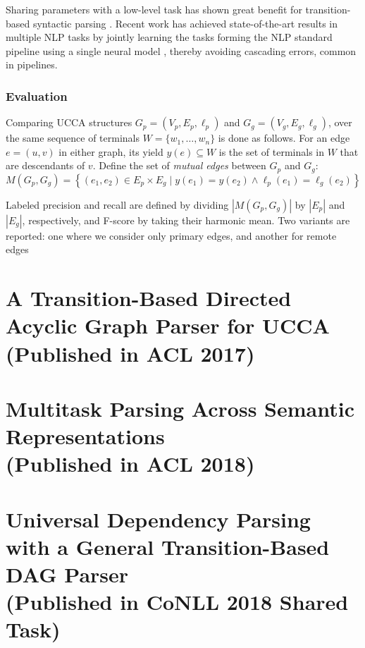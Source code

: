 \documentclass[12pt,a4paper]{report}
\begin{document}
Sharing parameters with a low-level task
has shown great benefit for transition-based syntactic parsing
\citep{bohnet2012transition,Zhang2016StackpropagationIR,constant-nivre:2016:P16-1,more2016joint}.
Recent work has achieved state-of-the-art results in multiple NLP tasks
by jointly learning the tasks forming the NLP standard pipeline using 
a single neural model \citep{collobert2011natural,D17-1206},
thereby avoiding cascading errors, common in pipelines.


\subsection*{Evaluation}
Comparing UCCA structures
$G_p=(V_p,E_p,\ell_p)$ and $G_g=(V_g,E_g,\ell_g)$,
over the same sequence of terminals $W = \{w_1,\ldots,w_n\}$
is done as follows.
For an edge $e=(u,v)$ in either graph, its yield $y(e) \subseteq W$ is the
set of terminals in $W$ that are descendants of $v$.
Define the set of \textit{mutual edges} between $G_p$ and $G_g$:
\[
    M(G_p,G_g) =
    \left\{(e_1,e_2) \in E_p \times E_g \;|\;
    y(e_1) = y(e_2) \wedge \ell_p(e_1)=\ell_g(e_2)\right\}
\]

Labeled precision and recall are defined by dividing $|M(G_p,G_g)|$ by $|E_p|$ and $|E_g|$, respectively,
and F-score by taking their harmonic mean.
Two variants are reported: one where we consider only primary edges,
and another for remote edges



\chapter{A Transition-Based Directed Acyclic Graph Parser for UCCA \\ (Published in ACL 2017)}



\chapter{Multitask Parsing Across Semantic Representations \\ (Published in ACL 2018)}



\chapter{Universal Dependency Parsing with a General Transition-Based DAG Parser \\ (Published in CoNLL 2018 Shared Task)}
\end{document}
